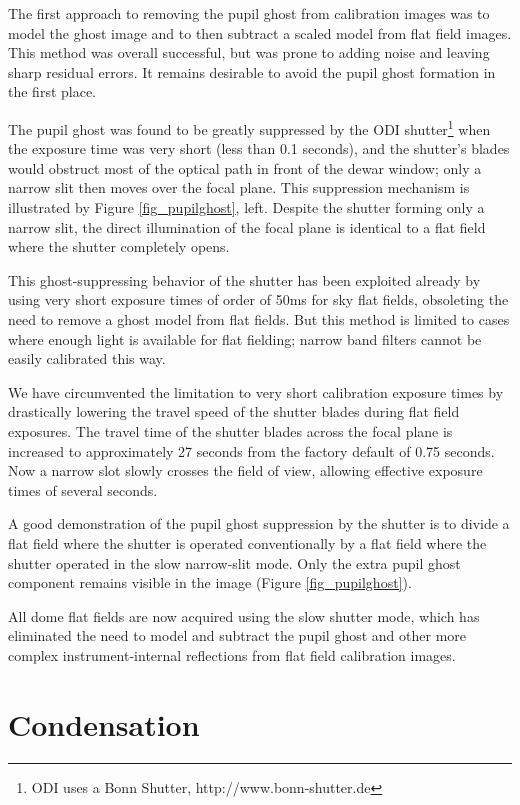 \documentclass[]{spieman}
\begin{document}
The first approach to removing the pupil ghost from calibration images was to
model the ghost image and to then subtract a scaled model from flat field
images. This method was overall successful, but was prone to adding noise and
leaving sharp residual errors. It remains desirable to avoid the pupil ghost
formation in the first place.

The pupil ghost was found to be greatly suppressed by the ODI
shutter\footnote{ODI uses a Bonn Shutter, http://www.bonn-shutter.de} when the
exposure time was very short (less than 0.1 seconds), and the shutter's blades
would obstruct most of the optical path in front of the dewar window; only a
narrow slit then moves  over the focal plane. This suppression mechanism is
illustrated by Figure \ref{fig_pupilghost}, left. Despite the shutter forming
only a narrow slit, the direct illumination of the focal plane is identical to a
flat field where the shutter completely opens.

This ghost-suppressing behavior of the shutter has been exploited already by
using very short exposure times of order of 50ms for sky flat fields, obsoleting
the need to remove a ghost model from flat fields. But this method is limited to
cases where enough light is available for flat fielding; narrow band filters
cannot be easily calibrated this way.

We have circumvented the limitation to very short calibration exposure times by
drastically lowering the travel speed of the shutter blades during flat field
exposures. The travel time of the shutter blades across the focal plane is
increased to approximately  27 seconds from the factory default of 0.75 seconds.
Now a narrow slot slowly crosses the field of view, allowing effective exposure
times of several seconds.

A good demonstration of the pupil ghost suppression by the shutter is to divide
a flat field where the shutter is operated conventionally by a flat field where
the shutter  operated in the slow narrow-slit mode. Only the extra pupil ghost
component remains visible in the image (Figure \ref{fig_pupilghost}).

All dome flat fields are now acquired using the slow shutter mode, which has
eliminated the need to model and subtract the pupil ghost and other more complex
instrument-internal reflections from flat field calibration images.

\section{Condensation}
\end{document}

